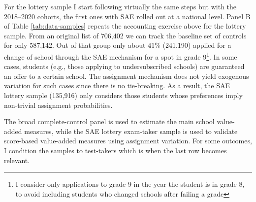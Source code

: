 \documentclass[a4paper, article, english, oneside, unknownkeysallowed, 12pt]{memoir}
\begin{document}
For the lottery sample I start following virtually the same steps but with the 2018--2020 cohorts, the first ones with SAE rolled out at a national level.
Panel B of Table \ref{tab:data-samples} repeats the accounting exercise above for the lottery sample. 
From an original list of 706,402 we can track the baseline set of controls for only 587,142. 
Out of that group only about 41\% (241,190) applied for a change of school through the SAE mechanism for a spot in grade 9\footnote{I consider only applications to grade 9 in the year the student is in grade 8, to avoid including students who changed schools after failing a grade}.
In some cases, students (e.g., those applying to undersubscribed schools) are guaranteed an offer to a certain school. 
The assignment mechanism does not yield exogenous variation for such cases since there is no tie-breaking.
As a result, the SAE lottery sample (135,916) only considers those students whose preferences imply non-trivial assignment probabilities. 





The broad complete-control panel is used to estimate the main school value-added measures, while the SAE lottery exam-taker sample is used to validate score-based value-added measures using assignment variation.
For some outcomes, I condition the samples to test-takers which is when the last row becomes relevant.
\end{document}
